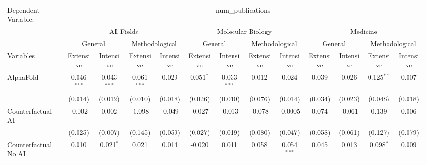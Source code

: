 \begingroup
\centering
\begin{tabular}{lcccccccccccc}
   \tabularnewline \midrule \midrule
   Dependent Variable: & \multicolumn{12}{c}{num\_publications}\\
 & \multicolumn{4}{c}{All Fields} & \multicolumn{4}{c}{Molecular Biology} & \multicolumn{4}{c}{Medicine} \\
\cmidrule(lr){2-5} \cmidrule(lr){6-9} \cmidrule(lr){10-13}
 & \multicolumn{2}{c}{General} & \multicolumn{2}{c}{Methodological} & \multicolumn{2}{c}{General} & \multicolumn{2}{c}{Methodological} & \multicolumn{2}{c}{General} & \multicolumn{2}{c}{Methodological} \\
\cmidrule(lr){2-3} \cmidrule(lr){4-5} \cmidrule(lr){6-7} \cmidrule(lr){8-9} \cmidrule(lr){10-11} \cmidrule(lr){12-13}
Variables & \multicolumn{1}{c}{Extensive} & \multicolumn{1}{c}{Intensive} & \multicolumn{1}{c}{Extensive} & \multicolumn{1}{c}{Intensive} & \multicolumn{1}{c}{Extensive} & \multicolumn{1}{c}{Intensive} & \multicolumn{1}{c}{Extensive} & \multicolumn{1}{c}{Intensive} & \multicolumn{1}{c}{Extensive} & \multicolumn{1}{c}{Intensive} & \multicolumn{1}{c}{Extensive} & \multicolumn{1}{c}{Intensive} \\
\cmidrule(lr){1-1}\cmidrule(lr){2-2} \cmidrule(lr){3-3} \cmidrule(lr){4-4} \cmidrule(lr){5-5} \cmidrule(lr){6-6} \cmidrule(lr){7-7} \cmidrule(lr){8-8} \cmidrule(lr){9-9} \cmidrule(lr){10-10} \cmidrule(lr){11-11} \cmidrule(lr){12-12} \cmidrule(lr){13-13}
   AlphaFold                                & 0.046$^{***}$ & 0.043$^{***}$ & 0.061$^{***}$ & 0.029   & 0.051$^{*}$ & 0.033$^{***}$ & 0.012   & 0.024         & 0.039   & 0.026   & 0.125$^{**}$ & 0.007\\   
                                            & (0.014)       & (0.012)       & (0.010)       & (0.018) & (0.026)     & (0.010)       & (0.076) & (0.014)       & (0.034) & (0.023) & (0.048)      & (0.018)\\   
   Counterfactual AI                        & -0.002        & 0.002         & -0.098        & -0.049  & -0.027      & -0.013        & -0.078  & -0.0005       & 0.074   & -0.061  & 0.139        & 0.006\\   
                                            & (0.025)       & (0.007)       & (0.145)       & (0.059) & (0.027)     & (0.019)       & (0.080) & (0.047)       & (0.058) & (0.061) & (0.127)      & (0.079)\\   
   Counterfactual No AI                     & 0.010         & 0.021$^{*}$   & 0.021         & 0.014   & -0.020      & 0.011         & 0.058   & 0.054$^{***}$ & 0.045   & 0.013   & 0.098$^{*}$  & 0.009\\   

\end{tabular}
